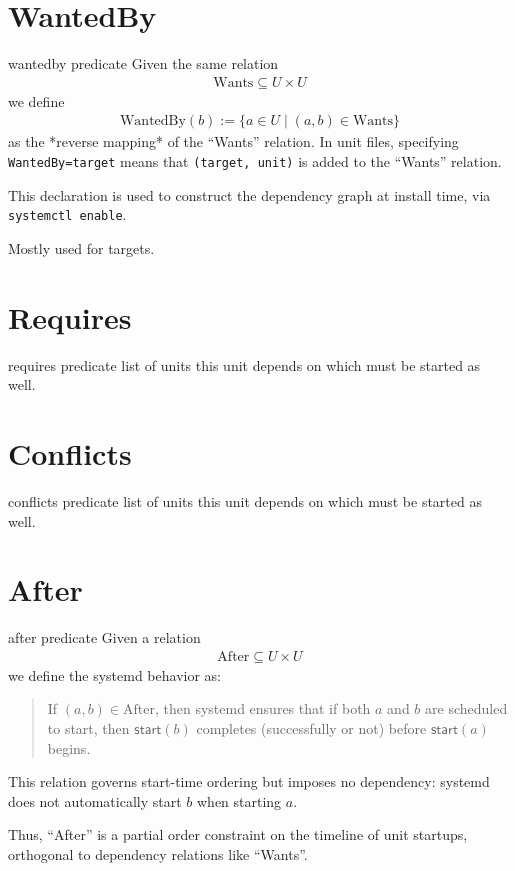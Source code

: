 \documentclass[openany, 12pt]{book}
\begin{document}
\section{WantedBy}
\begin{definition}{wantedby predicate}{}
  Given the same relation
  \begin{align*}
    \text{Wants} \subseteq U \times U
  \end{align*}
  we define
  \begin{align*}
    \text{WantedBy}(b) := \{ a \in U \mid (a, b) \in \text{Wants} \}
  \end{align*}
  as the *reverse mapping* of the ``Wants'' relation. In unit files, specifying
  \texttt{WantedBy=target} means that \texttt{(target, unit)} is added to the
  ``Wants'' relation.

  This declaration is used to construct the dependency graph at install time,
  via \texttt{systemctl enable}.

  Mostly used for targets.
\end{definition}

\section{Requires}
\begin{definition}{requires predicate}{}
  list of units this unit depends on which must be started as well.
\end{definition}

\section{Conflicts}
\begin{definition}{conflicts predicate}{}
  list of units this unit depends on which must be started as well.
\end{definition}

\section{After}
\begin{definition}{after predicate}{}
  Given a relation
  \begin{align*}
    \text{After} \subseteq U \times U
  \end{align*}
  we define the systemd behavior as:

  \begin{quote}
    If $(a, b) \in \text{After}$, then systemd ensures that if both $a$ and
    $b$ are scheduled to start, then $\mathsf{start}(b)$ completes
    (successfully or not) before $\mathsf{start}(a)$ begins.
  \end{quote}

  This relation governs start-time ordering but imposes no dependency: systemd
  does not automatically start $b$ when starting $a$.

  Thus, ``After'' is a partial order constraint on the timeline of unit
  startups, orthogonal to dependency relations like ``Wants''.
\end{definition}
\end{document}
